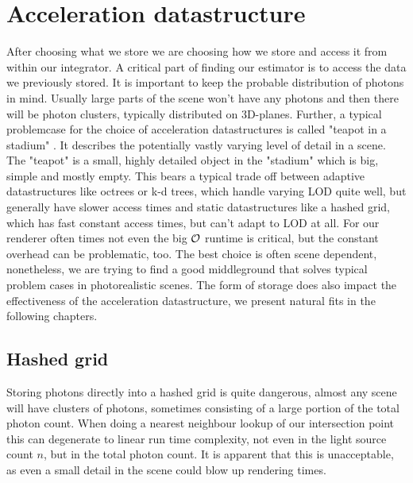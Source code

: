 \section{Acceleration datastructure}
\label{ch:AccelDat}

After choosing what we store we are choosing how we store and access it from within our integrator. A critical part of finding our estimator is to access the data we previously stored. It is important to keep the probable distribution of photons in mind. Usually large parts of the scene won't have any photons and then there will be photon clusters, typically distributed on 3D-planes. Further, a typical problemcase for the choice of acceleration datastructures is called "teapot in a stadium" . It describes the potentially vastly varying level of detail in a scene. The "teapot" is a small, highly detailed object in the "stadium" which is big, simple and mostly empty. This bears a typical trade off between adaptive datastructures like octrees or k-d trees, which handle varying LOD quite well, but generally have slower access times and static datastructures like a hashed grid, which has fast constant access times, but can't adapt to LOD at all. For our renderer often times not even the big $\mathcal{O}$ runtime is critical, but the constant overhead can be problematic, too. The best choice is often scene dependent, nonetheless, we are trying to find a good middleground that solves typical problem cases in photorealistic scenes. The form of storage does also impact the effectiveness of the acceleration datastructure, we present natural fits in the following chapters.

\subsection{Hashed grid}
\label{ch:pnee:hashedgrid}
Storing photons directly into a hashed grid is quite dangerous, almost any scene will have clusters of photons, sometimes consisting of a large portion of the total photon count. When doing a nearest neighbour lookup of our intersection point this can degenerate to linear run time complexity, not even in the light source count $n$, but in the total photon count. It is apparent that this is unacceptable, as even a small detail in the scene could blow up rendering times.

